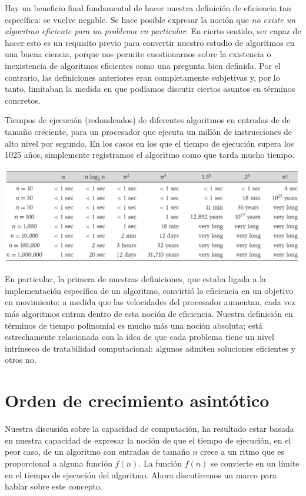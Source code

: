 \documentclass[a4paper, 12pt]{book}
\theoremstyle{dotless}
\begin{document}
Hay un beneficio final fundamental de hacer nuestra definición de eficiencia tan específica: se vuelve negable. Se hace posible expresar la noción que \textit{no existe un algoritmo eficiente para un problema en particular}. En cierto sentido, ser capaz de hacer esto es un requisito previo para convertir nuestro estudio de algoritmos en una buena ciencia, porque nos permite cuestionarnos sobre la existencia o inexistencia de algoritmos eficientes como una pregunta bien definida. Por el contrario, las definiciones anteriores eran completamente subjetivas y, por lo tanto, limitaban la medida en que podíamos discutir ciertos asuntos en términos concretos.

\begin{table}[h]
    \centering
    \caption{Tiempos de ejecución (redondeados) de diferentes algoritmos en entradas de
de tamaño creciente, para un procesador que ejecuta un millón de instrucciones de alto nivel por segundo.
En los casos en los que el tiempo de ejecución supera los 1025 años, simplemente registramos el algoritmo como que tarda mucho tiempo.}
\includegraphics[width=1\textwidth]{Imagenes-Seccion1/Figura1.PNG}
\label{tab:tabla2_1}
\end{table}

En particular, la primera de nuestras definiciones, que estaba ligada a la implementación específica de un algoritmo, convirtió la eficiencia en un objetivo en movimiento: a medida que las velocidades del procesador aumentan, cada vez más algoritmos entran dentro de esta noción de eficiencia. Nuestra definición en términos de tiempo polinomial es mucho más una noción absoluta; está estrechamente relacionada con la idea de que cada problema tiene un nivel intrínseco de tratabilidad computacional: algunos admiten soluciones eficientes y otros no.

\section{Orden de crecimiento asintótico}

Nuestra discusión sobre la capacidad de computación, ha resultado estar basada en nuestra capacidad de expresar la noción de que el tiempo de ejecución, en el peor caso, de un algoritmo con entradas de tamaño $n$ crece a un ritmo que es proporcional a alguna función $f(n)$. La función $f(n)$ se convierte en un límite en el tiempo de ejecución del algoritmo. Ahora discutiremos un marco para hablar sobre este concepto.
\end{document}
